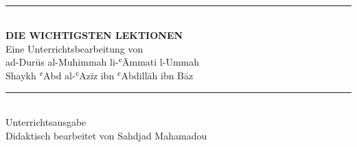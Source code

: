 \clearpage
\thispagestyle{empty}
\null\vspace*{34mm}
\begin{center}
  {\color{OffWhite}\fontsize{28}{34}\selectfont\mbox{}}\\[6mm]
  {\color{AccentLight}\rule{28mm}{0.5pt}}\\[12mm]
  {\headingfont\bfseries\color{OffWhite}\fontsize{34}{40}\selectfont DIE WICHTIGSTEN LEKTIONEN}\\[10mm]
  {\headingfont\color{LightSage}\fontsize{13}{16}\selectfont Eine Unterrichtsbearbeitung von}\\[2mm]
  {\headingfont\color{OffWhite}\fontsize{15}{18}\selectfont ad-Durūs al-Muhimmah li-ʿĀmmati l-Ummah}\\[8mm]
  {\headingfont\color{OffWhite}\fontsize{14}{18}\selectfont Shaykh ʿAbd al-ʿAzīz ibn ʿAbdillāh ibn Bāz }\\[24mm]
  {\color{Terracotta}\rule{18mm}{0.6pt}}\\[6mm]
  {\headingfont\color{AccentLight}\fontsize{12}{15}\selectfont Unterrichtsausgabe}\\[2mm]
  {\headingfont\color{OffWhite}\fontsize{13}{16}\selectfont Didaktisch bearbeitet von Sahdjad Mahamadou}
\end{center}
\clearpage
